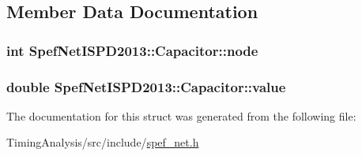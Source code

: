 \subsection{Member Data Documentation}
\hypertarget{structSpefNetISPD2013_1_1Capacitor_a137cb22b268fa33013b463c040b66240}{
\subsubsection[{node}]{\setlength{\rightskip}{0pt plus 5cm}int Spef\-Net\-I\-S\-P\-D2013\-::\-Capacitor\-::node}}\label{structSpefNetISPD2013_1_1Capacitor_a137cb22b268fa33013b463c040b66240}
\hypertarget{structSpefNetISPD2013_1_1Capacitor_a7aed9c0945e3baccf5d774352400a238}{
\subsubsection[{value}]{\setlength{\rightskip}{0pt plus 5cm}double Spef\-Net\-I\-S\-P\-D2013\-::\-Capacitor\-::value}}\label{structSpefNetISPD2013_1_1Capacitor_a7aed9c0945e3baccf5d774352400a238}


The documentation for this struct was generated from the following file\-:\begin{DoxyCompactItemize}
\item 
Timing\-Analysis/src/include/\hyperlink{spef__net_8h}{spef\-\_\-net.\-h}\end{DoxyCompactItemize}
